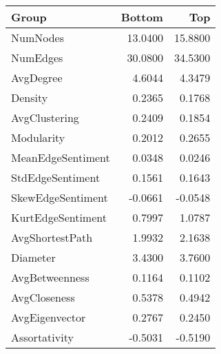 \begin{tabular}{lrr}
\toprule
Group & Bottom & Top \\
\midrule
NumNodes & 13.0400 & 15.8800 \\
NumEdges & 30.0800 & 34.5300 \\
AvgDegree & 4.6044 & 4.3479 \\
Density & 0.2365 & 0.1768 \\
AvgClustering & 0.2409 & 0.1854 \\
Modularity & 0.2012 & 0.2655 \\
MeanEdgeSentiment & 0.0348 & 0.0246 \\
StdEdgeSentiment & 0.1561 & 0.1643 \\
SkewEdgeSentiment & -0.0661 & -0.0548 \\
KurtEdgeSentiment & 0.7997 & 1.0787 \\
AvgShortestPath & 1.9932 & 2.1638 \\
Diameter & 3.4300 & 3.7600 \\
AvgBetweenness & 0.1164 & 0.1102 \\
AvgCloseness & 0.5378 & 0.4942 \\
AvgEigenvector & 0.2767 & 0.2450 \\
Assortativity & -0.5031 & -0.5190 \\
\bottomrule
\end{tabular}
